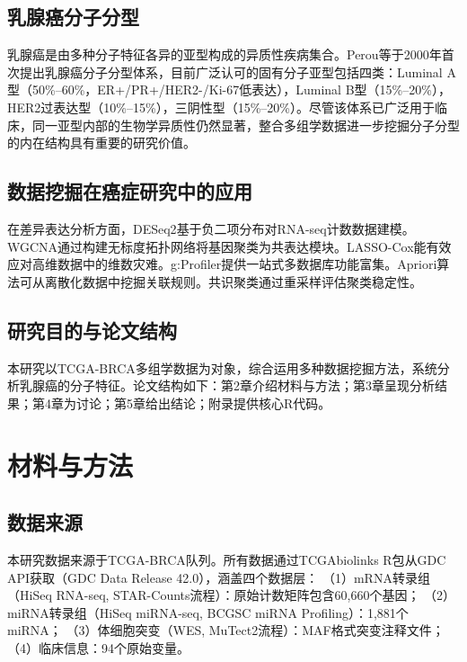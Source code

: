 \documentclass[12pt,a4paper]{ctexart}
\begin{document}
\subsection{乳腺癌分子分型}

乳腺癌是由多种分子特征各异的亚型构成的异质性疾病集合。Perou等\cite{perou2000molecular}于2000年首次提出乳腺癌分子分型体系，目前广泛认可的固有分子亚型包括四类：Luminal A型（50\%--60\%，ER+/PR+/HER2-/Ki-67低表达），Luminal B型（15\%--20\%），HER2过表达型（10\%--15\%），三阴性型（15\%--20\%）。尽管该体系已广泛用于临床，同一亚型内部的生物学异质性仍然显著，整合多组学数据进一步挖掘分子分型的内在结构具有重要的研究价值。

\subsection{数据挖掘在癌症研究中的应用}

在差异表达分析方面，DESeq2\cite{love2014moderated}基于负二项分布对RNA-seq计数数据建模。WGCNA\cite{langfelder2008wgcna}通过构建无标度拓扑网络将基因聚类为共表达模块。LASSO-Cox\cite{simon2011regularization}能有效应对高维数据中的维数灾难。g:Profiler\cite{kolberg2023gprofiler}提供一站式多数据库功能富集。Apriori算法\cite{agrawal1994fast}可从离散化数据中挖掘关联规则。共识聚类\cite{wilkerson2010consensus}通过重采样评估聚类稳定性。

\subsection{研究目的与论文结构}

本研究以TCGA-BRCA多组学数据为对象，综合运用多种数据挖掘方法，系统分析乳腺癌的分子特征。论文结构如下：第2章介绍材料与方法；第3章呈现分析结果；第4章为讨论；第5章给出结论；附录提供核心R代码。

\section{材料与方法}

\subsection{数据来源}

本研究数据来源于TCGA-BRCA队列。所有数据通过TCGAbiolinks R包\cite{colaprico2016tcgabiolinks}从GDC API获取（GDC Data Release 42.0），涵盖四个数据层：
（1）mRNA转录组（HiSeq RNA-seq, STAR-Counts流程）：原始计数矩阵包含60,660个基因；
（2）miRNA转录组（HiSeq miRNA-seq, BCGSC miRNA Profiling）：1,881个miRNA；
（3）体细胞突变（WES, MuTect2流程）：MAF格式突变注释文件；
（4）临床信息：94个原始变量。
\end{document}
